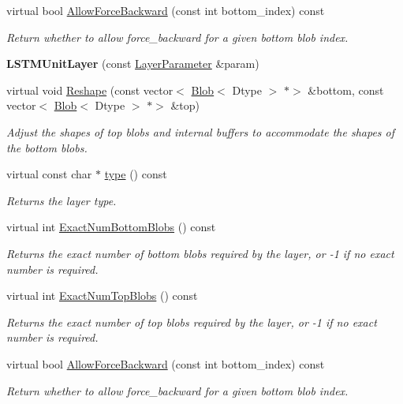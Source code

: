 \begin{DoxyCompactItemize}
virtual bool \mbox{\hyperlink{classcaffe_1_1_l_s_t_m_unit_layer_a9c46167bc8b96b28196bc24a5515b531}{Allow\+Force\+Backward}} (const int bottom\+\_\+index) const
\begin{DoxyCompactList}\small\item\em Return whether to allow force\+\_\+backward for a given bottom blob index. \end{DoxyCompactList}\item 
\mbox{\label{classcaffe_1_1_l_s_t_m_unit_layer_aa8eb86f949a93c724c6ed89a601aa4e0}} 
{\bfseries L\+S\+T\+M\+Unit\+Layer} (const \mbox{\hyperlink{classcaffe_1_1_layer_parameter}{Layer\+Parameter}} \&param)
\item 
virtual void \mbox{\hyperlink{classcaffe_1_1_l_s_t_m_unit_layer_aa6b2edc73f84705744f9f17ad2d014bb}{Reshape}} (const vector$<$ \mbox{\hyperlink{classcaffe_1_1_blob}{Blob}}$<$ Dtype $>$ $\ast$$>$ \&bottom, const vector$<$ \mbox{\hyperlink{classcaffe_1_1_blob}{Blob}}$<$ Dtype $>$ $\ast$$>$ \&top)
\begin{DoxyCompactList}\small\item\em Adjust the shapes of top blobs and internal buffers to accommodate the shapes of the bottom blobs. \end{DoxyCompactList}\item 
\mbox{\label{classcaffe_1_1_l_s_t_m_unit_layer_a684fc0eb2d2277651b26609ec7314747}} 
virtual const char $\ast$ \mbox{\hyperlink{classcaffe_1_1_l_s_t_m_unit_layer_a684fc0eb2d2277651b26609ec7314747}{type}} () const
\begin{DoxyCompactList}\small\item\em Returns the layer type. \end{DoxyCompactList}\item 
virtual int \mbox{\hyperlink{classcaffe_1_1_l_s_t_m_unit_layer_a087f5f5b0e6c50d98e7a7d04aa35f1b9}{Exact\+Num\+Bottom\+Blobs}} () const
\begin{DoxyCompactList}\small\item\em Returns the exact number of bottom blobs required by the layer, or -\/1 if no exact number is required. \end{DoxyCompactList}\item 
virtual int \mbox{\hyperlink{classcaffe_1_1_l_s_t_m_unit_layer_a5f56fd304b6581697cbf309ebb8bc9b7}{Exact\+Num\+Top\+Blobs}} () const
\begin{DoxyCompactList}\small\item\em Returns the exact number of top blobs required by the layer, or -\/1 if no exact number is required. \end{DoxyCompactList}\item 
virtual bool \mbox{\hyperlink{classcaffe_1_1_l_s_t_m_unit_layer_a9c46167bc8b96b28196bc24a5515b531}{Allow\+Force\+Backward}} (const int bottom\+\_\+index) const
\begin{DoxyCompactList}\small\item\em Return whether to allow force\+\_\+backward for a given bottom blob index. \end{DoxyCompactList}\end{DoxyCompactItemize}
